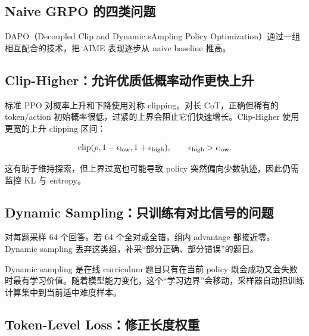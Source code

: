 \documentclass[a4paper]{article}
\begin{document}
\subsection{Naive GRPO 的四类问题}


DAPO（Decoupled Clip and Dynamic sAmpling Policy Optimization）通过一组相互配合的技术，把 AIME 表现逐步从 naive baseline 推高。

\subsection{Clip-Higher：允许优质低概率动作更快上升}

标准 PPO 对概率上升和下降使用对称 clipping。对长 CoT，正确但稀有的 token/action 初始概率很低，过紧的上界会阻止它们快速增长。Clip-Higher 使用更宽的上升 clipping 区间：

$$
\operatorname{clip}(\rho,1-\epsilon_{\rm low},1+\epsilon_{\rm high}),
\qquad \epsilon_{\rm high}>\epsilon_{\rm low}.
$$


这有助于维持探索，但上界过宽也可能导致 policy 突然偏向少数轨迹，因此仍需监控 KL 与 entropy。

\subsection{Dynamic Sampling：只训练有对比信号的问题}

对每题采样 64 个回答。若 64 个全对或全错，组内 advantage 都接近零。Dynamic sampling 丢弃这类组，补采“部分正确、部分错误”的题目。


\begin{knowledgebox}{Dynamic sampling 是在线 curriculum}
题目只有在当前 policy 既会成功又会失败时最有学习价值。随着模型能力变化，这个“学习边界”会移动，采样器自动把训练计算集中到当前适中难度样本。
\end{knowledgebox}

\subsection{Token-Level Loss：修正长度权重}
\end{document}
